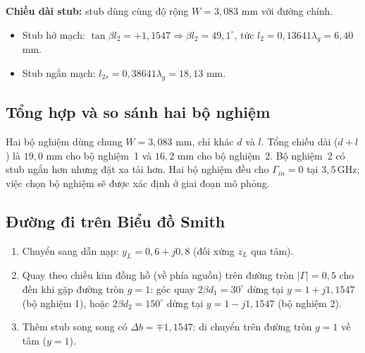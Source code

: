 \documentclass[a4paper]{report}
\newcommand\GHz{\,\mathrm{GHz}}
\begin{document}
\textbf{Chiều dài stub:} stub dùng cùng độ rộng $W=3{,}083$ mm với đường chính.
\begin{itemize}
  \item Stub hở mạch: $\tan\beta l_2=+1{,}1547\Rightarrow\beta l_2=49{,}1^\circ$, tức $l_2=0{,}13641\lambda_g=6{,}40$ mm.
  \item Stub ngắn mạch: $l_{2s}=0{,}38641\lambda_g=18{,}13$ mm.
\end{itemize}

\subsection{Tổng hợp và so sánh hai bộ nghiệm}
\begin{table}[H]
\caption{Kết quả thiết kế Single-Stub ($Z_0=50\,\Omega$, $\lambda_g=46{,}922$ mm)}\label{tab:stub}
\centering\footnotesize\setlength\tabcolsep{3pt}
\end{table}
Hai bộ nghiệm dùng chung $W=3{,}083$ mm, chỉ khác $d$ và $l$. Tổng chiều dài ($d+l$) là $19{,}0$ mm cho bộ nghiệm~1 và $16{,}2$ mm cho bộ nghiệm~2. Bộ nghiệm~2 có stub ngắn hơn nhưng đặt xa tải hơn. Hai bộ nghiệm đều cho $\Gamma_{in}=0$ tại $3{,}5\GHz$; việc chọn bộ nghiệm sẽ được xác định ở giai đoạn mô phỏng.

\subsection{Đường đi trên Biểu đồ Smith}
\begin{enumerate}
  \item Chuyển sang dẫn nạp: $y_L=0{,}6+j0{,}8$ (đối xứng $z_L$ qua tâm).
  \item Quay theo chiều kim đồng hồ (về phía nguồn) trên đường tròn $|\Gamma|=0{,}5$ cho đến khi gặp đường tròn $g=1$: góc quay $2\beta d_1=30^\circ$ dừng tại $y=1+j1{,}1547$ (bộ nghiệm 1), hoặc $2\beta d_2=150^\circ$ dừng tại $y=1-j1{,}1547$ (bộ nghiệm 2).
  \item Thêm stub song song có $\Delta b=\mp1{,}1547$: di chuyển trên đường tròn $g=1$ về tâm ($y=1$).
\end{enumerate}
\end{document}
